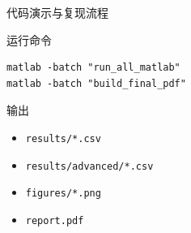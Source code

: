 \documentclass[UTF8,aspectratio=169,11pt]{ctexbeamer}
\begin{document}
\begin{frame}[fragile]{代码演示与复现流程}
    \begin{block}{运行命令}
        \begin{verbatim}
matlab -batch "run_all_matlab"
matlab -batch "build_final_pdf"
        \end{verbatim}
    \end{block}
    \begin{block}{输出}
        \begin{itemize}
            \item \texttt{results/*.csv}
            \item \texttt{results/advanced/*.csv}
            \item \texttt{figures/*.png}
            \item \texttt{report.pdf}
        \end{itemize}
    \end{block}
\end{frame}
\end{document}

